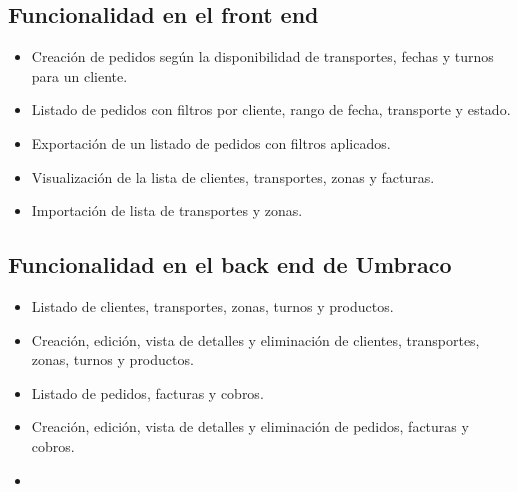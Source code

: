 \subsection{Funcionalidad en el front end}
\begin{itemize}
    \item Creación de pedidos según la disponibilidad de transportes, fechas y turnos para un cliente.
    \item Listado de pedidos con filtros por cliente, rango de fecha, transporte y estado.
    \item Exportación de un listado de pedidos con filtros aplicados.
    \item Visualización de la lista de clientes, transportes, zonas y facturas.
    \item Importación de lista de transportes y zonas.
\end{itemize}

\subsection{Funcionalidad en el back end de Umbraco}
\begin{itemize}
    \item Listado de clientes, transportes, zonas, turnos y productos.
    \item Creación, edición, vista de detalles y eliminación de clientes, transportes, zonas, turnos y productos.
    \item Listado de pedidos, facturas y cobros.
    \item Creación, edición, vista de detalles y eliminación de pedidos, facturas y cobros.
    \item 
\end{itemize}
